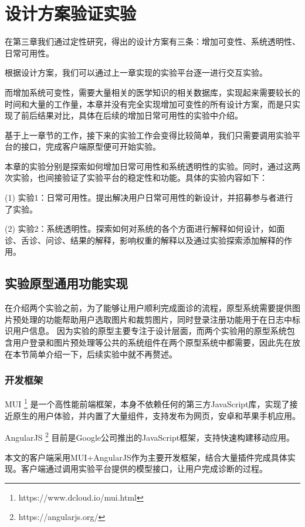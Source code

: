 \chapter{设计方案验证实验}


在第三章我们通过定性研究，得出的设计方案有三条：增加可变性、系统透明性、日常可用性。

根据设计方案，我们可以通过上一章实现的实验平台逐一进行交互实验。

而增加系统可变性，需要大量相关的医学知识的相关数据库，实现起来需要较长的时间和大量的工作量，本章并没有完全实现增加可变性的所有设计方案，而是只实现了前后结果对比，具体在后续的增加日常可用性的实验中介绍。

基于上一章节的工作，接下来的实验工作会变得比较简单，我们只需要调用实验平台的接口，完成客户端原型便可开始实验。

本章的实验分别是探索如何增加日常可用性和系统透明性的实验。同时，通过这两次实验，也间接验证了实验平台的稳定性和功能。具体的实验内容如下：

(1) 实验1：日常可用性。提出解决用户日常可用性的新设计，并招募参与者进行了实验。

(2) 实验2：系统透明性。探索如何对系统的各个方面进行解释如何设计，如面诊、舌诊、问诊、结果的解释，影响权重的解释以及通过实验探索添加解释的作用。

\section{实验原型通用功能实现}
在介绍两个实验之前，为了能够让用户顺利完成面诊的流程，原型系统需要提供图片预处理的功能帮助用户选取图片和裁剪图片，同时登录注册功能用于在日志中标识用户信息。
因为实验的原型主要专注于设计层面，而两个实验用的原型系统包含用户登录和图片预处理等公共的系统组件在两个原型系统中都需要，因此先在放在本节简单介绍一下，后续实验中就不再赘述。
\subsection{开发框架}
MUI \footnote{https://www.dcloud.io/mui.html} 是一个高性能前端框架，本身不依赖任何的第三方JavaScript库，实现了接近原生的用户体验，并内置了大量组件，支持发布为网页，安卓和苹果手机应用。

AngularJS \footnote{https://angularjs.org/} 目前是Google公司推出的JavaScript框架，支持快速构建移动应用。

本文的客户端采用MUI+AngularJS作为主要开发框架，结合大量插件完成具体实现。客户端通过调用实验平台提供的模型接口，让用户完成诊断的过程。

